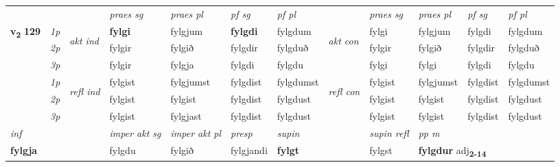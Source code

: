 \begin{longtable}[l]{X>{\footnotesize\itshape}llXXXXlXXXX}
 & &   & \textit{praes sg}  & \textit{praes pl}    & \textit{ pf sg} & \textit{pf pl} & & \textit{praes sg}  & \textit{praes pl}    & \textit{pf sg} & \textit{pf pl }  \\ \cmidrule{4-7} \cmidrule{9-12}
 \multirow{2}{*}{{{\textbf{v{\textsubscript{2}}} \Large{\textbf{129}}}}}  & 1p & \multirow{3}{*}{\begin{turn}{90}\textit{akt ind}\end{turn}} & \textbf{fylgi} & fylgjum & \textbf{fylgdi} & fylgdum & \multirow{3}{*}{\begin{turn}{90}\textit{akt con}\end{turn}} &fylgi & fylgjum & fylgdi & fylgdum\\*
 & 2p &  &  fylgir  & fylgið & fylgdir & fylgduð & & fylgir & fylgið & fylgdir & fylgduð \\*
 & 3p &  & fylgir & fylgja & fylgdi & fylgdu & & fylgi & fylgi& fylgdi & fylgdu \\*
\cmidrule{4-7} \cmidrule{9-12}
 & 1p & \multirow{3}{*}{\begin{turn}{90}\textit{refl ind}\end{turn}}  & fylgist & fylgjumst & fylgdist & fylgdumst & \multirow{3}{*}{\begin{turn}{90}\textit{refl con}\end{turn}}  &fylgist & fylgjumst & fylgdist & fylgdumst \\*
 & 2p &  & fylgist & fylgist & fylgdist & fylgdust & &fylgist & fylgist & fylgdist & fylgdust \\*
 & 3p  & & fylgist & fylgjast & fylgdist & fylgdust & & fylgist & fylgist& fylgdist & fylgdust \\*
\cmidrule{4-7} \cmidrule{9-12}

   {\textit{inf}} & &  & \textit{imper akt sg} & \textit{imper akt pl}   & \textit{presp} & \textit{supin} && \textit{supin refl} & \textit{pp m} \\*
  {\textbf{fylgja}} & && fylgdu  & fylgið   & fylgjandi &  \textbf{fylgt} && fylgst & \multicolumn{2}{l}{\textbf{fylgdur} adj\textbf{\textsubscript{2-14}}} \\*

\midrule


\end{longtable}
